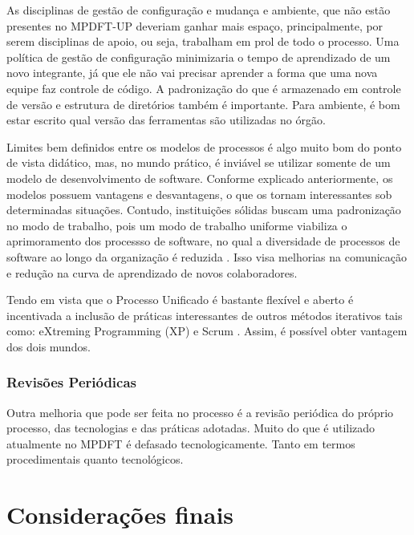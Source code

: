 \documentclass[
	article,			%
	11pt,				%
	oneside,			%
	a4paper,			%
	english,			%
	brazil,				%
	sumario=tradicional
	]{abntex2}
\begin{document}
As disciplinas de gestão de configuração e mudança e ambiente, que não estão
presentes no MPDFT-UP deveriam ganhar mais espaço, principalmente, por serem
disciplinas de apoio, ou seja, trabalham em prol de todo o processo. Uma
política de gestão de configuração minimizaria o tempo de aprendizado de um novo
integrante, já que ele não vai precisar aprender a forma que uma nova equipe faz
controle de código. A padronização do que é armazenado em controle de versão e
estrutura de diretórios também é importante. Para ambiente, é bom estar escrito
qual versão das ferramentas são utilizadas no órgão.

Limites bem definidos entre os modelos de processos é algo muito bom do ponto de
vista didático, mas, no mundo prático, é inviável se utilizar somente de um
modelo de desenvolvimento de software. Conforme explicado anteriormente, os
modelos possuem vantagens e desvantagens, o que os tornam interessantes sob
determinadas situações. Contudo, instituições sólidas buscam uma padronização no
modo de trabalho, pois um modo de trabalho uniforme viabiliza o aprimoramento
dos processso de software, no qual a diversidade de processos de software ao
longo da organização é reduzida \cite{sommerville2007}. Isso visa melhorias na
comunicação e redução na curva de aprendizado de novos colaboradores.

Tendo em vista que o Processo Unificado é bastante flexível e aberto é
incentivada a inclusão de práticas interessantes de outros métodos iterativos
tais como: eXtreming Programming (XP) \cite{Beck:1999:ECE:619045.621348} e Scrum
\cite{schwaber2002agile}. Assim, é possível obter vantagem dos dois mundos.

\subsubsection{Revisões Periódicas}

Outra melhoria que pode ser feita no processo é a revisão periódica do próprio
processo, das tecnologias e das práticas adotadas. Muito do que é utilizado
atualmente no MPDFT é defasado tecnologicamente. Tanto em termos procedimentais
quanto tecnológicos.

% 

\section*{Considerações finais}
\end{document}
